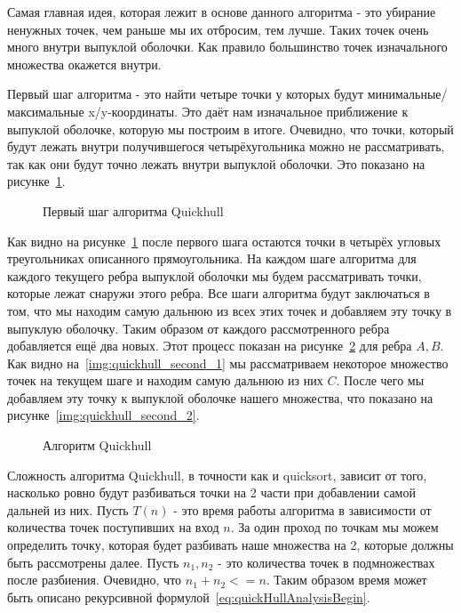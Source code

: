 Самая главная идея, которая лежит в основе данного алгоритма - это убирание ненужных точек, чем раньше мы их отбросим, тем лучше. Таких точек очень много внутри выпуклой оболочки. Как правило большинство точек изначального множества окажется внутри.

Первый шаг алгоритма - это найти четыре точки у которых будут минимальные/максимальные x/y-координаты. Это даёт нам изначальное приближение к выпуклой оболочке, которую мы построим в итоге. Очевидно, что точки, который будут лежать внутри получившегося четырёхугольника можно не рассматривать, так как они будут точно лежать внутри выпуклой оболочки. Это показано на рисунке~\ref{img:quickhull_first}.

\begin{figure}[H]
	{\centering
		\hfill
		\subbottom{%
			}
		\hfill
	}
	\caption{Первый шаг алгоритма Quickhull}
	\label{img:quickhull_first}
\end{figure}

Как видно на рисунке~\ref{img:quickhull_first} после первого шага остаются точки в четырёх угловых треугольниках описанного прямоугольника. На каждом шаге алгоритма для каждого текущего ребра выпуклой оболочки мы будем рассматривать точки, которые лежат снаружи этого ребра. Все шаги алгоритма будут заключаться в том, что мы находим самую дальнюю из всех этих точек и добавляем эту точку в выпуклую оболочку. Таким образом от каждого рассмотренного ребра добавляется ещё два новых. Этот процесс показан на рисунке~\ref{img:quickhull_second} для ребра $A, B$. Как видно на~\ref{img:quickhull_second_1} мы рассматриваем некоторое множество точек на текущем шаге и находим самую дальнюю из них $C$. После чего мы добавляем эту точку к выпуклой оболочке нашего множества, что показано на рисунке~\ref{img:quickhull_second_2}.

\begin{figure}[H]
	{\centering
		\hfill
		\subbottom[\label{img:quickhull_second_1}]{%
			}
		\hfill
		\subbottom[\label{img:quickhull_second_2}]{%
			}
		\hfill
	}
	\caption{Алгоритм Quickhull}
	\label{img:quickhull_second}
\end{figure}

Сложность алгоритма Quickhull, в точности как и quicksort, зависит от того, насколько ровно будут разбиваться точки на 2 части при добавлении самой дальней из них. Пусть $T(n)$ - это время работы алгоритма в зависимости от количества точек поступивших на вход $n$. За один проход по точкам мы можем определить точку, которая будет разбивать наше множества на 2, которые должны быть рассмотрены далее. Пусть $n_1, n_2$ - это количества точек в подмножествах после разбиения. Очевидно, что $n_1+n_2<=n$. Таким образом время может быть описано рекурсивной формулой~\ref{eq:quickHullAnalysisBegin}.

